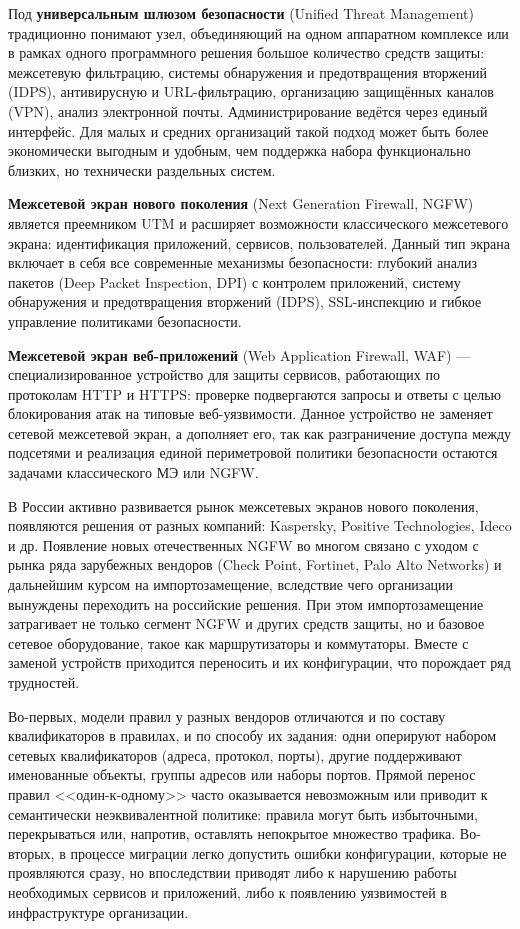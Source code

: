 Под \textbf{универсальным шлюзом безопасности} (Unified Threat Management) традиционно понимают узел, объединяющий на одном аппаратном комплексе или в рамках одного программного решения большое количество средств защиты: межсетевую фильтрацию, системы обнаружения и предотвращения вторжений (IDPS), антивирусную и URL-фильтрацию, организацию защищённых каналов (VPN), анализ электронной почты. Администрирование ведётся через единый интерфейс.
Для малых и средних организаций такой подход может быть более экономически выгодным и удобным, чем поддержка набора функционально близких, но технически раздельных систем.

\textbf{Межсетевой экран нового поколения} (Next Generation Firewall, NGFW) является преемником UTM и расширяет возможности классического межсетевого экрана: идентификация приложений, сервисов, пользователей. Данный тип экрана включает в себя все современные механизмы безопасности: глубокий анализ пакетов (Deep Packet Inspection, DPI) с контролем приложений, систему обнаружения и предотвращения вторжений (IDPS), SSL-инспекцию и гибкое управление политиками безопасности.

\textbf{Межсетевой экран веб-приложений} (Web Application Firewall, WAF) --- специализированное устройство для защиты сервисов, работающих по протоколам HTTP и HTTPS: проверке подвергаются запросы и ответы с целью блокирования атак на типовые веб-уязвимости. Данное устройство не заменяет сетевой межсетевой экран, а дополняет его, так как разграничение доступа между подсетями и реализация единой периметровой политики безопасности остаются задачами классического МЭ или NGFW.

В России активно развивается рынок межсетевых экранов нового поколения, появляются решения от разных компаний: Kaspersky, Positive Technologies, Ideco и др. Появление новых отечественных NGFW во многом связано с уходом с рынка ряда зарубежных вендоров (Check Point, Fortinet, Palo Alto Networks) и дальнейшим курсом на импортозамещение, вследствие чего организации вынуждены переходить на российские решения. При этом импортозамещение затрагивает не только сегмент NGFW и других средств защиты, но и базовое сетевое оборудование, такое как маршрутизаторы и коммутаторы. Вместе с заменой устройств приходится переносить и их конфигурации, что порождает ряд трудностей.

Во-первых, модели правил у разных вендоров отличаются и по составу квалификаторов в правилах, и по способу их задания: одни оперируют набором сетевых квалификаторов (адреса, протокол, порты), другие поддерживают именованные объекты, группы адресов или наборы портов. Прямой перенос правил <<один-к-одному>> часто оказывается невозможным или приводит к семантически неэквивалентной политике: правила могут быть избыточными, перекрываться или, напротив, оставлять непокрытое множество трафика. Во-вторых, в процессе миграции легко допустить ошибки конфигурации, которые не проявляются сразу, но впоследствии приводят либо к нарушению работы необходимых сервисов и приложений, либо к появлению уязвимостей в инфраструктуре организации.

